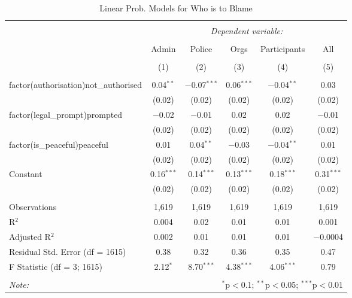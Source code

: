 
\begin{table}[!htbp] \centering 
  \caption{Linear Prob. Models for Who is to Blame} 
  \label{} 
\begin{tabular}{@{\extracolsep{5pt}}lccccc} 
\\[-1.8ex]\hline 
\hline \\[-1.8ex] 
 & \multicolumn{5}{c}{\textit{Dependent variable:}} \\ 
\cline{2-6} 
\\[-1.8ex] & Admin & Police & Orgs & Participants & All \\ 
\\[-1.8ex] & (1) & (2) & (3) & (4) & (5)\\ 
\hline \\[-1.8ex] 
 factor(authorisation)not\_authorised & 0.04$^{**}$ & $-$0.07$^{***}$ & 0.06$^{***}$ & $-$0.04$^{**}$ & 0.03 \\ 
  & (0.02) & (0.02) & (0.02) & (0.02) & (0.02) \\ 
  factor(legal\_prompt)prompted & $-$0.02 & $-$0.01 & 0.02 & 0.02 & $-$0.01 \\ 
  & (0.02) & (0.02) & (0.02) & (0.02) & (0.02) \\ 
  factor(is\_peaceful)peaceful & 0.01 & 0.04$^{**}$ & $-$0.03 & $-$0.04$^{**}$ & 0.01 \\ 
  & (0.02) & (0.02) & (0.02) & (0.02) & (0.02) \\ 
  Constant & 0.16$^{***}$ & 0.14$^{***}$ & 0.13$^{***}$ & 0.18$^{***}$ & 0.31$^{***}$ \\ 
  & (0.02) & (0.02) & (0.02) & (0.02) & (0.02) \\ 
 \hline \\[-1.8ex] 
Observations & 1,619 & 1,619 & 1,619 & 1,619 & 1,619 \\ 
R$^{2}$ & 0.004 & 0.02 & 0.01 & 0.01 & 0.001 \\ 
Adjusted R$^{2}$ & 0.002 & 0.01 & 0.01 & 0.01 & $-$0.0004 \\ 
Residual Std. Error (df = 1615) & 0.38 & 0.32 & 0.36 & 0.35 & 0.47 \\ 
F Statistic (df = 3; 1615) & 2.12$^{*}$ & 8.70$^{***}$ & 4.38$^{***}$ & 4.06$^{***}$ & 0.79 \\ 
\hline 
\hline \\[-1.8ex] 
\textit{Note:}  & \multicolumn{5}{r}{$^{*}$p$<$0.1; $^{**}$p$<$0.05; $^{***}$p$<$0.01} \\ 
\end{tabular} 
\end{table} 
